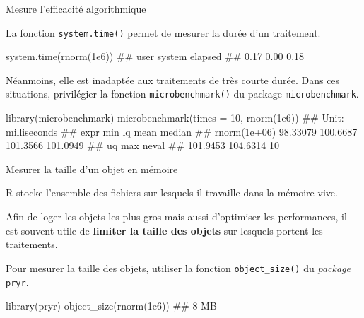 \documentclass[12pt,ignorenonframetext,]{beamer}
\newenvironment{Shaded}{}{}
\newcommand{\DataTypeTok}[1]{#1}
\newcommand{\DecValTok}[1]{#1}
\newcommand{\FloatTok}[1]{#1}
\newcommand{\KeywordTok}[1]{\textcolor[rgb]{0.00,0.00,1.00}{#1}}
\newcommand{\NormalTok}[1]{#1}
\renewenvironment{Shaded}{\begin{snugshade}}{\end{snugshade}}
\begin{document}
\begin{frame}[fragile]{Mesure l’efficacité algorithmique}
\protect\hypertarget{mesure-lefficacite-algorithmique}{}

La fonction \texttt{system.time()} permet de mesurer la durée d’un
traitement.

\footnotesize

\begin{Shaded}
\begin{Highlighting}[]
\KeywordTok{system.time}\NormalTok{(}\KeywordTok{rnorm}\NormalTok{(}\FloatTok{1e6}\NormalTok{))}
\NormalTok{  ##    user  system elapsed }
\NormalTok{  ##    0.17    0.00    0.18}
\end{Highlighting}
\end{Shaded}

\pause \normalsize

Néanmoins, elle est inadaptée aux traitements de très courte durée. Dans
ces situations, privilégier la fonction \texttt{microbenchmark()} du
package \texttt{microbenchmark}.

\footnotesize

\begin{Shaded}
\begin{Highlighting}[]
\KeywordTok{library}\NormalTok{(microbenchmark)}
\KeywordTok{microbenchmark}\NormalTok{(}\DataTypeTok{times =} \DecValTok{10}\NormalTok{, }\KeywordTok{rnorm}\NormalTok{(}\FloatTok{1e6}\NormalTok{))}
\NormalTok{  ## Unit: milliseconds}
\NormalTok{  ##          expr      min       lq     mean   median}
\NormalTok{  ##  rnorm(1e+06) 98.33079 100.6687 101.3566 101.0949}
\NormalTok{  ##        uq      max neval}
\NormalTok{  ##  101.9453 104.6314    10}
\end{Highlighting}
\end{Shaded}

\end{frame}

\begin{frame}[fragile]{Mesurer la taille d’un objet en mémoire}
\protect\hypertarget{mesurer-la-taille-dun-objet-en-memoire}{}

R stocke l’ensemble des fichiers sur lesquels il travaille dans la
mémoire vive.

Afin de loger les objets les plus gros mais aussi d’optimiser les
performances, il est souvent utile de \textbf{limiter la taille des
objets} sur lesquels portent les traitements.

\pause Pour mesurer la taille des objets, utiliser la fonction
\texttt{object\_size()} du \emph{package} \texttt{pryr}.

\begin{Shaded}
\begin{Highlighting}[]
\KeywordTok{library}\NormalTok{(pryr)}
\KeywordTok{object_size}\NormalTok{(}\KeywordTok{rnorm}\NormalTok{(}\FloatTok{1e6}\NormalTok{))}
\NormalTok{  ## 8 MB}
\end{Highlighting}
\end{Shaded}

\end{frame}
\end{document}
